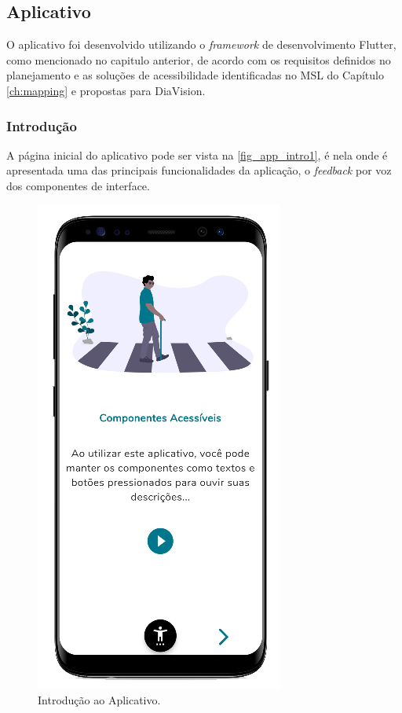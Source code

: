 \newpage

\subsection{Aplicativo}

O aplicativo foi desenvolvido utilizando o \emph{framework} de desenvolvimento Flutter, como mencionado
no capitulo anterior, de acordo com os requisitos definidos no planejamento e as soluções de acessibilidade
identificadas no MSL do Capítulo \ref{ch:mapping} e propostas para DiaVision.

\subsubsection{Introdução}

A página inicial do aplicativo pode ser vista na \autoref{fig_app_intro1}, é nela onde é apresentada
uma das principais funcionalidades da aplicação, o \emph{feedback} por voz dos componentes de interface.

\begin{figure}[htb]
    \caption{\label{fig_app_intro1}Introdução ao Aplicativo.}
    \begin{center}
        \includegraphics[scale=0.70]{Imagens/desenvolvimento/app/intro_1.png}
    \end{center}
\end{figure}

